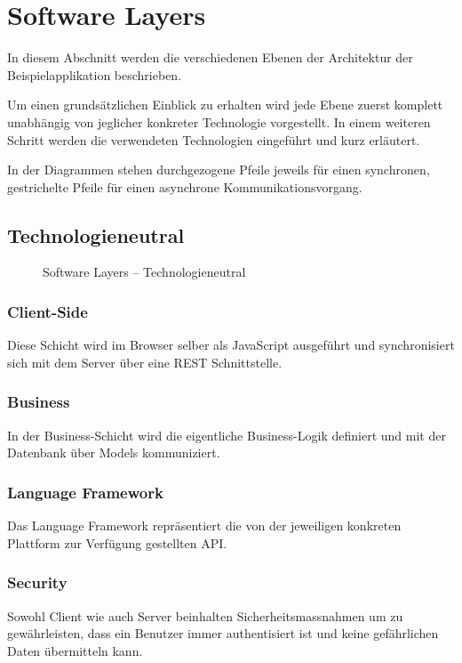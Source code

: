 \section{Software Layers}

In diesem Abschnitt werden die verschiedenen Ebenen der Architektur der Beispielapplikation beschrieben.

Um einen grundsätzlichen Einblick zu erhalten wird jede Ebene zuerst komplett unabhängig von jeglicher konkreter Technologie vorgestellt. In einem weiteren Schritt werden die verwendeten Technologien eingeführt und kurz erläutert.

In der Diagrammen stehen durchgezogene Pfeile jeweils für einen synchronen, gestrichelte Pfeile für einen asynchrone Kommunikationsvorgang.


\subsection*{Technologieneutral}

\begin{figure}[H]
	\centering{
		
	}

	\caption{Software Layers -- Technologieneutral}
\end{figure}

\subsubsection*{Client-Side}
Diese Schicht wird im Browser selber als JavaScript ausgeführt und synchronisiert sich mit dem Server über eine REST Schnittstelle.

\subsubsection*{Business}
In der Business-Schicht wird die eigentliche Business-Logik definiert und mit der Datenbank über Models kommuniziert.

\subsubsection*{Language Framework}
Das Language Framework repräsentiert die von der jeweiligen konkreten Plattform zur Verfügung gestellten API.

\subsubsection*{Security}
Sowohl Client wie auch Server beinhalten Sicherheitsmassnahmen um zu gewährleisten, dass ein \gls{Benutzer} immer authentisiert ist und keine gefährlichen Daten übermitteln kann.

